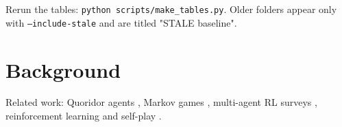 \documentclass[11pt]{article}
\begin{document}
Rerun the tables: \texttt{python scripts/make\_tables.py}. Older folders appear only with
\texttt{--include-stale} and are titled "STALE baseline".
\section*{Background}
Related work: Quoridor agents \cite{jose2022quoridor}, Markov games \cite{littman1994markov}, multi-agent RL surveys \cite{busoniu2008comprehensive,zhang2021selective}, reinforcement learning \cite{sutton2018reinforcement} and self-play \cite{silver2018alphazero}.


\end{document}

